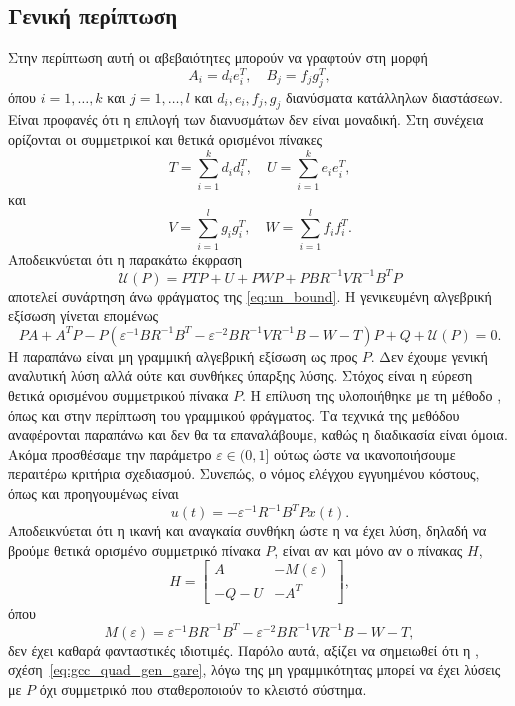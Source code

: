 \subsection{Γενική περίπτωση}
Στην περίπτωση αυτή οι αβεβαιότητες μπορούν να γραφτούν στη μορφή
\[
    A_i = d_ie_i^T, \quad
    B_j = f_jg_j^T,
\]
όπου \( i = 1, \dots, k \) και \( j = 1, \dots, l \) και \(d_i, e_i, f_j, g_j \)
διανύσματα κατάλληλων διαστάσεων. Είναι προφανές ότι η επιλογή των διανυσμάτων
δεν είναι μοναδική. Στη συνέχεια ορίζονται οι συμμετρικοί και θετικά ορισμένοι
πίνακες
\[
    T = \sum_{i = 1}^k d_id_i^T, \quad
    U = \sum_{i = 1}^k e_ie_i^T,
\]
και
\[
    V = \sum_{i = 1}^l g_ig_i^T, \quad
    W = \sum_{i = 1}^l f_if_i^T.
\]
Αποδεικνύεται ότι η παρακάτω έκφραση
\[
    \mathcal{U}(P) = PTP + U + PWP + PBR^{-1}VR^{-1}B^TP
\]
αποτελεί συνάρτηση άνω φράγματος της \eqref{eq:un_bound}. Η γενικευμένη αλγεβρική εξίσωση
 γίνεται επομένως
\begin{equation}\label{eq:gcc_quad_gen_gare}
    PA + A^TP - P
    \left(\varepsilon^{-1}BR^{-1}B^T - \varepsilon^{-2}BR^{-1}VR^{-1}B - W - T\right)
    P + Q + \mathcal{U}(P) = 0.
\end{equation}
Η παραπάνω είναι μη γραμμική αλγεβρική εξίσωση ως προς \( P \). Δεν έχουμε
γενική αναλυτική λύση αλλά ούτε και συνθήκες ύπαρξης λύσης. Στόχος είναι η
εύρεση θετικά ορισμένου συμμετρικού πίνακα \( P \). Η επίλυση της υλοποιήθηκε
με τη μέθοδο , όπως και στην περίπτωση του γραμμικού φράγματος.
Τα τεχνικά της μεθόδου αναφέρονται παραπάνω και δεν θα τα επαναλάβουμε,
καθώς η διαδικασία είναι όμοια. Ακόμα προσθέσαμε την παράμετρο
\( \varepsilon \in (0, 1] \) ούτως ώστε να ικανοποιήσουμε περαιτέρω κριτήρια
σχεδιασμού. Συνεπώς, ο νόμος ελέγχου εγγυημένου κόστους, όπως και προηγουμένως είναι
\begin{equation}\label{eq:gcc_quad_gen_u}
    u(t) = -\varepsilon^{-1}R^{-1}B^{T}Px(t).
\end{equation}
Αποδεικνύεται ότι η ικανή και αναγκαία συνθήκη ώστε η  να έχει λύση,
δηλαδή να βρούμε θετικά ορισμένο συμμετρικό πίνακα \( P \), είναι αν και μόνο
αν ο πίνακας \( H \),
\[
    H =
    \begin{bmatrix}
        A & -M(\varepsilon) \\
        -Q - U & -A^T
    \end{bmatrix},
\]
όπου
\[
    M(\varepsilon) =
    \varepsilon^{-1}BR^{-1}B^T - \varepsilon^{-2}BR^{-1}VR^{-1}B - W - T,
\]
δεν έχει καθαρά φανταστικές ιδιοτιμές. Παρόλο αυτά, αξίζει να σημειωθεί ότι
η , σχέση~\eqref{eq:gcc_quad_gen_gare}, λόγω της μη γραμμικότητας
μπορεί να έχει λύσεις με \( P \) όχι συμμετρικό που σταθεροποιούν το κλειστό
σύστημα.

